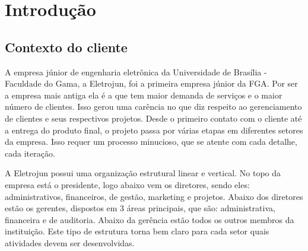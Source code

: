 \chapter[Introdução]{Introdução}

  \section{Contexto do cliente}
A empresa júnior de engenharia eletrônica da Universidade de Brasília - Faculdade do Gama, a Eletrojun, foi a primeira empresa júnior da FGA. Por ser a empresa mais antiga ela é a que tem maior demanda de serviços e o maior número de clientes. Isso gerou uma carência no que diz respeito ao gerenciamento de clientes e seus respectivos projetos. Desde o primeiro contato com o cliente até a entrega do produto final, o projeto passa por várias etapas em diferentes setores da empresa. Isso requer um processo minucioso, que se atente com cada detalhe, cada iteração.

A Eletrojun possui uma organização estrutural linear e vertical. No topo da empresa está o presidente, logo abaixo vem os diretores, sendo eles: administrativos, financeiros, de gestão, marketing e projetos. Abaixo dos diretores estão os gerentes, dispostos em 3 áreas principais, que são: administrativa, financeira e de auditoria. Abaixo da gerência estão todos os outros membros da instituição. Este tipo de estrutura torna bem claro para cada setor quais atividades devem ser desenvolvidas.